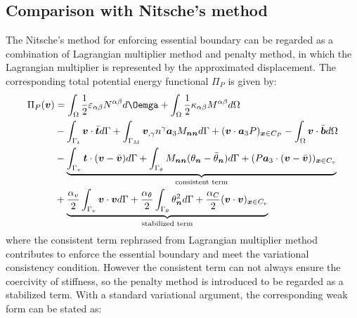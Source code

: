 \subsection{Comparison with Nitsche's method}
The Nitsche's method for enforcing essential boundary can be regarded as a combination of Lagrangian multiplier method and penalty method, in which the Lagrangian multiplier is represented by the approximated displacement. The corresponding total potential energy functional $\Pi_P$ is given by:
\begin{equation}
\begin{split}
\Pi_P(\boldsymbol v) &= \int_\Omega \frac{1}{2}\varepsilon_{\alpha\beta} N^{\alpha\beta} d\Oemga +
\int_\Omega \frac{1}{2} \kappa_{\alpha\beta}M^{\alpha\beta} d\Omega \\
                     &- \int_{\Gamma_t} \boldsymbol v \cdot \bar{\boldsymbol t} d\Gamma 
                     + \int_{\Gamma_M} \boldsymbol v_{,\gamma} n^\gamma \boldsymbol a_3 M_{\boldsymbol{nn}} d\Gamma
                     + (\boldsymbol v \cdot \boldsymbol a_3 P)_{\boldsymbol x \in C_P}
                     - \int_\Omega \boldsymbol v \cdot \bar{\boldsymbol b} d\Omega \\
                     &- \underbrace{\int_{\Gamma_v} \boldsymbol t \cdot (\boldsymbol v - \bar{\boldsymbol v}) d\Gamma
                     + \int_{\Gamma_\theta} M_{\boldsymbol{nn}}(\theta_{\boldsymbol n} - \bar \theta_{\boldsymbol n})d\Gamma
                     + (P\boldsymbol a_3 \cdot (\boldsymbol v - \bar{\boldsymbol v}))_{\boldsymbol x \in C_v}}_{\text{consistent term}} \\
                     &+ \underbrace{\frac{\alpha_v}{2} \int_{\Gamma_v} \boldsymbol v \cdot \boldsymbol v d\Gamma 
                     + \frac{\alpha_\theta}{2} \int_{\Gamma_\theta} \theta_{\boldsymbol n}^2 d\Gamma
             + \frac{\alpha_C}{2}(\boldsymbol v \cdot \boldsymbol v)_{\boldsymbol x\in C_v}}_{\text{stabilized term}}
\end{split}
\end{equation}
where the consistent term rephrased from Lagrangian multiplier method contributes to enforce the essential boundary and meet the variational consistency condition. However the consistent term can not always ensure the coercivity of stiffness, so the penalty method is introduced to be regarded as a stabilized term. With a standard variational argument, the corresponding weak form can be stated as:
